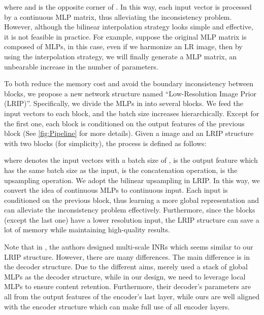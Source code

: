 \documentclass[10pt,journal,twocolumn,twoside]{IEEEtran}
\begin{document}
where  and  is the opposite corner of . In this way, each input vector is processed by a continuous MLP matrix, thus alleviating the inconsistency problem. However, although the bilinear interpolation strategy looks simple and effective, it is not feasible in practice. For example, suppose the original MLP matrix is composed of  MLPs, in this case, even if we harmonize an LR  image, then by using the interpolation strategy, we will finally generate a  MLP matrix, an unbearable  increase in the number of parameters.

To both reduce the memory cost and avoid the boundary inconsistency between blocks, we propose a new network structure named ``Low-Resolution Image Prior (LRIP)''. Specifically, we divide the MLPs in  into several blocks. We feed the input vectors to each block, and the batch size increases hierarchically. Except for the first one, each block is conditioned on the output features of the previous block (See \cref{fig:Pipeline} for more details). Given a  image and an LRIP structure with two blocks  (for simplicity), the process is defined as follows:


where  denotes the input vectors with a batch size of ,  is the output feature which has the same batch size as the input,  is the concatenation operation,  is the upsampling operation. We adopt the bilinear upsampling in LRIP. In this way, we convert the idea of continuous MLPs to continuous input. Each input is conditioned on the previous block, thus learning a more global representation and can alleviate the inconsistency problem effectively. Furthermore, since the blocks (except the last one) have a lower resolution input, the LRIP structure can save a lot of memory while maintaining high-quality results. 


Note that in \cite{skorokhodov2021adversarial}, the authors designed multi-scale INRs which seems similar to our LRIP structure. However, there are many differences. The main difference is in the decoder structure. Due to the different aims, \cite{skorokhodov2021adversarial} merely used a stack of global MLPs as the decoder structure, while in our design, we need to leverage local MLPs to ensure content retention. Furthermore, their decoder's parameters are all from the output features of the encoder's last layer, while ours are well aligned with the encoder structure which can make full use of all encoder layers.
\end{document}
